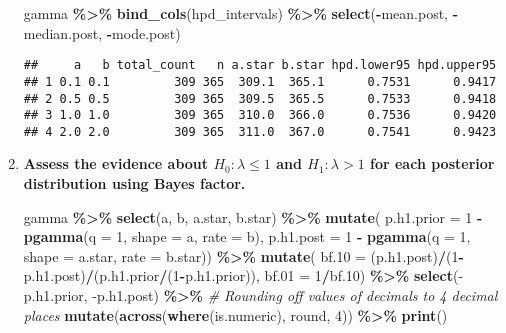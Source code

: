 \documentclass[]{article}
\newenvironment{Shaded}{\begin{snugshade}}{\end{snugshade}}
\newcommand{\AttributeTok}[1]{\textcolor[rgb]{0.13,0.29,0.53}{#1}}
\newcommand{\CommentTok}[1]{\textcolor[rgb]{0.56,0.35,0.01}{\textit{#1}}}
\newcommand{\DecValTok}[1]{\textcolor[rgb]{0.00,0.00,0.81}{#1}}
\newcommand{\FloatTok}[1]{\textcolor[rgb]{0.00,0.00,0.81}{#1}}
\newcommand{\FunctionTok}[1]{\textcolor[rgb]{0.13,0.29,0.53}{\textbf{#1}}}
\newcommand{\NormalTok}[1]{#1}
\newcommand{\SpecialCharTok}[1]{\textcolor[rgb]{0.81,0.36,0.00}{\textbf{#1}}}
\begin{document}
\begin{enumerate}
\begin{Shaded}
\begin{Highlighting}[]
\NormalTok{gamma }\SpecialCharTok{\%\textgreater{}\%}
 \FunctionTok{bind\_cols}\NormalTok{(hpd\_intervals) }\SpecialCharTok{\%\textgreater{}\%}
  \FunctionTok{select}\NormalTok{(}\SpecialCharTok{{-}}\NormalTok{mean.post, }\SpecialCharTok{{-}}\NormalTok{median.post, }\SpecialCharTok{{-}}\NormalTok{mode.post)}
\end{Highlighting}
\end{Shaded}

\begin{verbatim}
##     a   b total_count   n a.star b.star hpd.lower95 hpd.upper95
## 1 0.1 0.1         309 365  309.1  365.1      0.7531      0.9417
## 2 0.5 0.5         309 365  309.5  365.5      0.7533      0.9418
## 3 1.0 1.0         309 365  310.0  366.0      0.7536      0.9420
## 4 2.0 2.0         309 365  311.0  367.0      0.7541      0.9423
\end{verbatim}

\hfill

\item \textbf{Assess the evidence about $H_0: \lambda \leq 1$ and $H_1: \lambda > 1$ for each posterior distribution using Bayes factor.}

\begin{Shaded}
\begin{Highlighting}[]
\NormalTok{gamma }\SpecialCharTok{\%\textgreater{}\%}
  \FunctionTok{select}\NormalTok{(a, b, a.star, b.star) }\SpecialCharTok{\%\textgreater{}\%}
  \FunctionTok{mutate}\NormalTok{(}
    \AttributeTok{p.h1.prior =} \DecValTok{1} \SpecialCharTok{{-}} \FunctionTok{pgamma}\NormalTok{(}\AttributeTok{q =} \DecValTok{1}\NormalTok{, }\AttributeTok{shape =}\NormalTok{ a, }\AttributeTok{rate =}\NormalTok{ b),}
    \AttributeTok{p.h1.post =} \DecValTok{1} \SpecialCharTok{{-}} \FunctionTok{pgamma}\NormalTok{(}\AttributeTok{q =} \DecValTok{1}\NormalTok{, }\AttributeTok{shape =}\NormalTok{ a.star, }\AttributeTok{rate =}\NormalTok{ b.star)) }\SpecialCharTok{\%\textgreater{}\%}
  \FunctionTok{mutate}\NormalTok{(}
    \AttributeTok{bf.10 =}\NormalTok{ (p.h1.post)}\SpecialCharTok{/}\NormalTok{(}\DecValTok{1}\SpecialCharTok{{-}}\NormalTok{p.h1.post)}\SpecialCharTok{/}\NormalTok{(p.h1.prior}\SpecialCharTok{/}\NormalTok{(}\DecValTok{1}\SpecialCharTok{{-}}\NormalTok{p.h1.prior)),}
    \AttributeTok{bf.01 =} \DecValTok{1}\SpecialCharTok{/}\NormalTok{bf}\FloatTok{.10}\NormalTok{) }\SpecialCharTok{\%\textgreater{}\%}
  \FunctionTok{select}\NormalTok{(-p.h1.prior, -p.h1.post) }\SpecialCharTok{\%\textgreater{}\%}
    \CommentTok{\# Rounding off values of decimals to 4 decimal places}
    \FunctionTok{mutate}\NormalTok{(}\FunctionTok{across}\NormalTok{(}\FunctionTok{where}\NormalTok{(is.numeric), round, }\DecValTok{4}\NormalTok{)) }\SpecialCharTok{\%\textgreater{}\%}
  \FunctionTok{print}\NormalTok{()}
\end{Highlighting}
\end{Shaded}


\end{enumerate}
\end{document}
